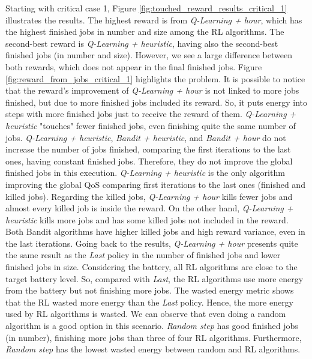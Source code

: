 Starting with critical case 1, Figure \ref{fig:touched_reward_results_critical_1} illustrates the results. The highest reward is from \emph{Q-Learning + hour}, which has the highest finished jobs in number and size among the RL algorithms. The second-best reward is \emph{Q-Learning + heuristic}, having also the second-best finished jobs (in number and size). However, we see a large difference between both rewards, which does not appear in the final finished jobs. Figure \ref{fig:reward_from_jobs_critical_1} highlights the problem. It is possible to notice that the reward's improvement of \emph{Q-Learning + hour} is not linked to more jobs finished, but due to more finished jobs included its reward. So, it puts energy into steps with more finished jobs just to receive the reward of them. \emph{Q-Learning + heuristic} "touches" fewer finished jobs, even finishing quite the same number of jobs. \emph{Q-Learning + heuristic}, \emph{Bandit + heuristic}, and \emph{Bandit + hour} do not increase the number of jobs finished, comparing the first iterations to the last ones, having constant finished jobs. Therefore, they do not improve the global finished jobs in this execution. \emph{Q-Learning + heuristic} is the only algorithm improving the global QoS comparing first iterations to the last ones (finished and killed jobs). Regarding the killed jobs, \emph{Q-Learning + hour} kills fewer jobs and almost every killed job is inside the reward. On the other hand, \emph{Q-Learning + heuristic} kills more jobs and has some killed jobs not included in the reward. Both Bandit algorithms have higher killed jobs and high reward variance, even in the last iterations. Going back to the results, \emph{Q-Learning + hour} presents quite the same result as the \emph{Last} policy in the number of finished jobs and lower finished jobs in size. Considering the battery, all RL algorithms are close to the target battery level. So, compared with \emph{Last}, the RL algorithms use more energy from the battery but not finishing more jobs. The wasted energy metric shows that the RL wasted more energy than the \emph{Last} policy. Hence, the more energy used by RL algorithms is wasted. We can observe that even doing a random algorithm is a good option in this scenario. \emph{Random step} has good finished jobs (in number), finishing more jobs than three of four RL algorithms. Furthermore, \emph{Random step} has the lowest wasted energy between random and RL algorithms.

